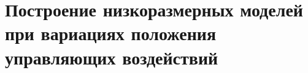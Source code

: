 \chapter{Построение низкоразмерных моделей при вариациях положения управляющих воздействий}\label{ch:ch3}


